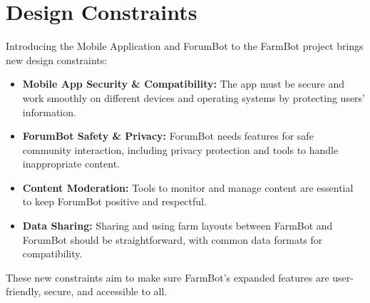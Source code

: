 \newpage

\section{Design Constraints}
Introducing the Mobile Application and ForumBot to the FarmBot project brings new design constraints:
\begin{itemize}
    \item \textbf{Mobile App Security \& Compatibility:} The app must be secure and work smoothly on different devices and operating systems by protecting users' information.
    \item \textbf{ForumBot Safety \& Privacy:} ForumBot needs features for safe community interaction, including privacy protection and tools to handle inappropriate content.
    \item \textbf{Content Moderation:} Tools to monitor and manage content are essential to keep ForumBot positive and respectful.
    \item \textbf{Data Sharing:} Sharing and using farm layouts between FarmBot and ForumBot should be straightforward, with common data formats for compatibility.
\end{itemize}
These new constraints aim to make sure FarmBot's expanded features are user-friendly, secure, and accessible to all.

